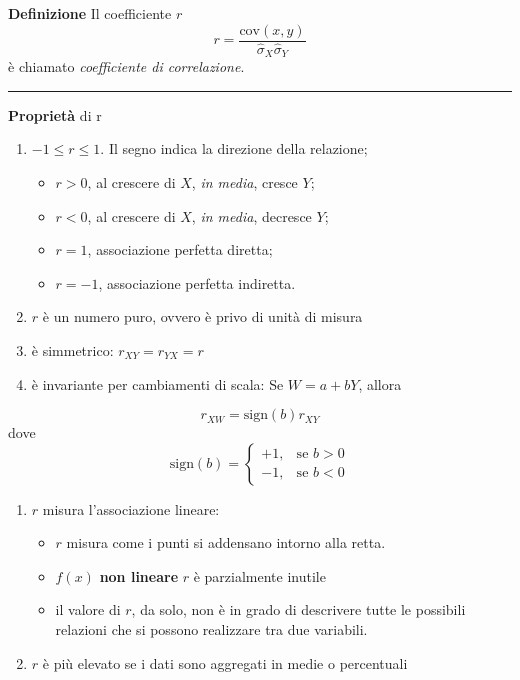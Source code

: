 \documentclass[
  11pt,
]{book}
\providecommand{\tightlist}{%
  \setlength{\itemsep}{0pt}\setlength{\parskip}{0pt}}
\theoremstyle{mytheoremstyle}
\theoremstyle{mydefstyle}
\begin{document}
\textbf{Definizione}
Il coefficiente \(r\)
\[r=\frac{\text{cov}(x,y)}{\hat\sigma_X\hat\sigma_Y}\]
è chiamato \emph{coefficiente di correlazione}.

\begin{center}\rule{0.5\linewidth}{0.5pt}\end{center}

\textbf{Proprietà} di r

\begin{enumerate}
\def\labelenumi{\arabic{enumi}.}
\tightlist
\item
  \(-1 \le r \le 1\). Il segno indica la direzione della relazione;

  \begin{itemize}
  \tightlist
  \item
    \(r>0\), al crescere di \(X\), \emph{in media}, cresce \(Y\);
  \item
    \(r<0\), al crescere di \(X\), \emph{in media}, decresce \(Y\);
  \item
    \(r=1\), associazione perfetta diretta;
  \item
    \(r=-1\), associazione perfetta indiretta.
  \end{itemize}
\item
  \(r\) è un numero puro, ovvero è privo di unità di misura
\item
  è simmetrico: \(r_{XY} = r_{YX} = r\)
\item
  è invariante per cambiamenti di scala:
  Se \(W=a+bY\), allora
\end{enumerate}

\[
r_{XW}=\text{sign}(b) r_{XY}
\]
dove
\[
\text{sign}(b)=\begin{cases}+1, &\text{se $b>0$}\\
             -1, &\text{se $b<0$}
\end{cases}
\]

\begin{enumerate}
\def\labelenumi{\arabic{enumi}.}
\setcounter{enumi}{4}
\tightlist
\item
  \(r\) misura l'associazione lineare:

  \begin{itemize}
  \tightlist
  \item
    \(r\) misura come i punti si addensano intorno alla retta.
  \item
    \(f(x)\) \textbf{non lineare} \(r\) è parzialmente inutile
  \item
    il valore di \(r\), da solo, non è in grado di descrivere tutte le possibili relazioni
    che si possono realizzare tra due variabili.
  \end{itemize}
\item
  \(r\) è più elevato se i dati sono aggregati in medie o percentuali
\end{enumerate}
\end{document}
